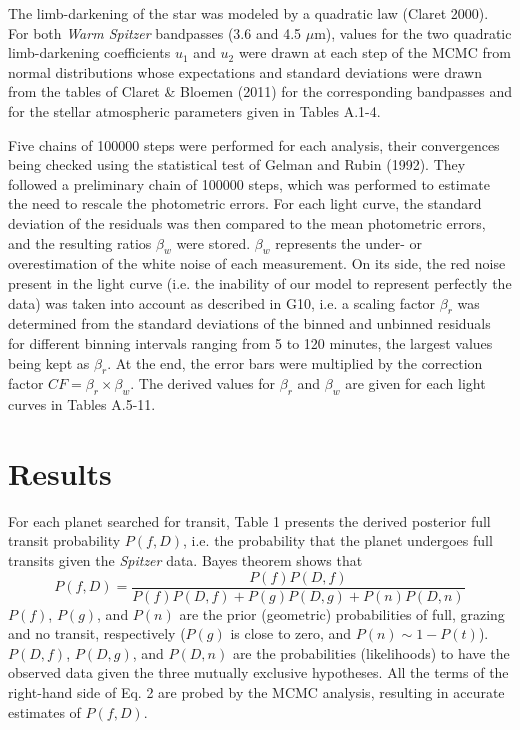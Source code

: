 \documentclass[traditabstract]{aa}
\begin{document}
The limb-darkening of the star was modeled by a quadratic law (Claret 2000). For both {\it Warm Spitzer}
 bandpasses (3.6 and 4.5 $\mu$m), values for the two quadratic limb-darkening coefficients $u_1$ and
  $u_2$ were drawn at each step of the MCMC from normal distributions whose expectations and 
  standard deviations were drawn from the tables of Claret \& Bloemen (2011) for the corresponding bandpasses 
  and for the stellar atmospheric parameters given in Tables A.1-4.

Five chains of 100000 steps were performed for each analysis, their convergences being checked using 
the statistical test of Gelman and Rubin (1992). They followed a preliminary chain of 100000 steps, 
which was performed to estimate the need to rescale the photometric errors. For each light curve, the standard deviation of 
the residuals was then compared to the mean photometric errors, and the resulting ratios $\beta_w$ were stored.  
$\beta_w$ represents the under-  or overestimation of the white noise of each measurement. On its side, the red 
noise present in the light curve (i.e. the inability of our model to represent perfectly the data) was taken into 
account as described in G10, i.e. a scaling factor $\beta_r$ was determined from the standard 
deviations of the binned and unbinned residuals for different binning intervals ranging from 5 to 120 minutes, the 
largest values being kept as $\beta_r$. At the end, the error bars  were multiplied by the correction factor $CF = 
\beta_r \times \beta_w$. The derived values for $\beta_r $ and  $\beta_w$ are given for each light curves in Tables A.5-11.

\section{Results}

For each planet searched for transit, Table 1 presents the derived posterior full transit probability $P(f,D)$,  i.e. the probability that the planet undergoes full transits given the {\it Spitzer} data. Bayes theorem shows that 
\begin{equation}
P(f,D) = \frac{P(f) P(D,f)}{P(f) P(D,f) + P(g) P(D,g) +  P(n) P(D,n)}
\end{equation} $P(f)$, $P(g)$, and $P(n)$ are the prior (geometric) probabilities of full, grazing and no transit, respectively ($P(g)$ is close to zero, and $P(n) \sim 1 - P(t)$).  $P(D,f)$, $P(D,g)$, and $P(D,n)$ are the probabilities (likelihoods) to have the observed data given the three mutually exclusive hypotheses. All the terms of the right-hand side of Eq. 2 are  probed by the MCMC analysis, resulting in accurate estimates of $P(f,D)$. 
\end{document}
